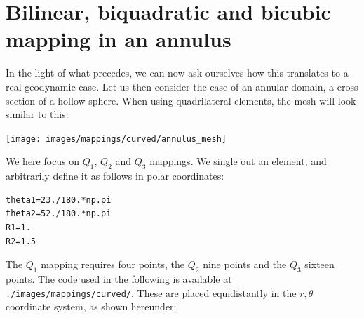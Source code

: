 \section{Bilinear, biquadratic and bicubic mapping in an annulus }

In the light of what precedes, we can now ask ourselves how this translates to 
a real geodynamic case. Let us then consider the case of an annular domain, 
a cross section of a hollow sphere. 
When using quadrilateral elements, the mesh will look similar to this:

\begin{center}
\texttt{[image: images/mappings/curved/annulus\_mesh]}
\end{center}

We here focus on $Q_1$, $Q_2$ and $Q_3$ mappings. We single out an element, 
and arbitrarily define it as follows in polar coordinates:
\begin{lstlisting}
theta1=23./180.*np.pi
theta2=52./180.*np.pi
R1=1.
R2=1.5
\end{lstlisting}
The $Q_1$ mapping requires four points, the $Q_2$ nine points and the $Q_3$
sixteen points. 
The code used in the following is available at {\tt ./images/mappings/curved/}.
These are placed equidistantly in the $r,\theta$ coordinate
system, as shown hereunder:

